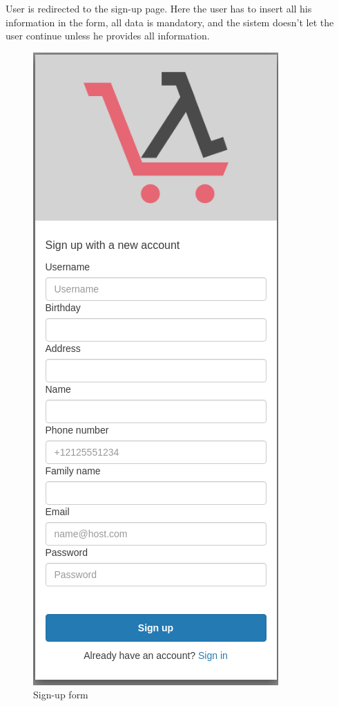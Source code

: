 User is redirected to the sign-up page. Here the user has to insert all his information in the form, all data is mandatory, and the sistem doesn't let the user continue unless he provides all information. \begin{figure}[!ht]
    \caption{Sign-up form}
    \vspace{10px}
    \includegraphics[scale=0.2]{../../../../Images/userManual/signUp.png}
    \centering
\end{figure}
